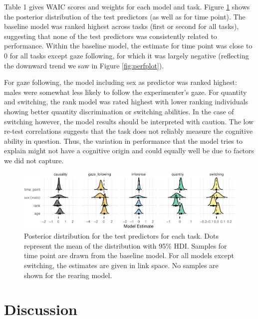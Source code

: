 \documentclass[10pt, letterpaper]{article}
\newenvironment{CodeChunk}{}{}
\begin{document}
Table 1 gives WAIC scores and weights for each model and task. Figure
\ref{fig:predplot} shows the posterior distribution of the test
predictors (as well as for time point). The baseline model was ranked
highest across tasks (first or second for all tasks), suggesting that
none of the test predictors was consistently related to performance.
Within the baseline model, the estimate for time point was close to 0
for all tasks except gaze following, for which it was largely negative
(reflecting the downward trend we saw in Figure \ref{fig:perfplot}).

For gaze following, the model including sex as predictor was ranked
highest: males were somewhat less likely to follow the experimenter's
gaze. For quantity and switching, the rank model was rated highest with
lower ranking individuals showing better quantity discrimination or
switching abilities. In the case of switching however, the model results
should be interpreted with caution. The low re-test correlations
suggests that the task does not reliably measure the cognitive ability
in question. Thus, the variation in performance that the model tries to
explain might not have a cognitive origin and could equally well be due
to factors we did not capture.

\begin{CodeChunk}
\begin{figure}[h]

{\centering \includegraphics{figs/predplot-1} 

}

\caption[Posterior distribution for the test predictors for each task]{Posterior distribution for the test predictors for each task. Dots represent the mean of the distribution with 95\% HDI. Samples for time point are drawn from the baseline model. For all models except switching, the estimates are given in link space. No samples are shown for the rearing model.}\label{fig:predplot}
\end{figure}
\end{CodeChunk}

\hypertarget{discussion}{%
\section{Discussion}\label{discussion}}
\end{document}
